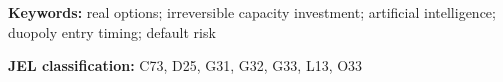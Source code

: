 \begin{center}
\begin{minipage}{0.85\textwidth}
\small
\noindent\textbf{Keywords:} real options; irreversible capacity investment; artificial intelligence; duopoly entry timing; default risk\par
\medskip
\noindent\textbf{JEL classification:} C73, D25, G31, G32, G33, L13, O33\par
\end{minipage}
\end{center}
\bigskip
